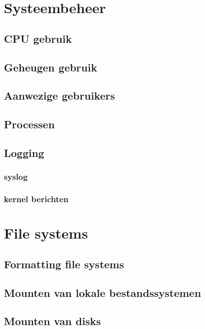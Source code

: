 \documentclass[a4paper,12pt,twoside,openright,titlepage]{book}
\begin{document}
\chapter{Systeembeheer}

\section{CPU gebruik}

\section{Geheugen gebruik}

\section{Aanwezige gebruikers}

\section{Processen}



\section{Logging}

\subsection{syslog}

\subsection{kernel berichten}


\chapter{File systems}

\section{Formatting file systems}

\section{Mounten van lokale bestandssystemen}

\section{Mounten van disks}

\end{document}
